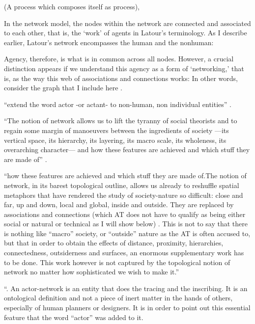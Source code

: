 (A process which composes itself as process), 



In the network model, the nodes within the network are connected and associated to each other, that is, the `work' of agents in Latour's terminology. As I describe earlier, Latour's network encompasses the human and the nonhuman: 

Agency, therefore, is what is in common across all nodes. However, a crucial distinction appears if we understand this agency as a form of `networking,' that is, as the way this web of associations and connections works: 
In other words, consider the graph that I include here . 

``extend the word actor -or actant- to non-human, non individual entities'' \parencite[2]{Lat90:On}.

``The notion of network allows us to lift the tyranny of social theorists and to regain some margin of manoeuvers between the ingredients of society ---its vertical space, its hierarchy, its layering, its macro scale, its wholeness, its overarching character--- and how these features are achieved and which stuff they are made of'' \parencite[5]{Lat90:On}.

``how these features are achieved and which stuff they are made of.The notion of network, in its barest topological outline, allows us already to reshuffle spatial metaphors that have rendered the study of society-nature so difficult: close and far, up and down, local and global, inside and outside. They are replaced by associations and connections (which AT does not have to qualify as being either social or natural or technical as I will show below) . This is not to say that there is nothing like “macro” society, or “outside” nature as the AT is often accused to, but that in order to obtain the effects of distance, proximity, hierarchies, connectedness, outsiderness and surfaces, an enormous supplementary work has to be done. This work however is not captured by the topological notion of network no matter how sophisticated we wish to make it.'' \parencite[6]{Lat90:On}

``. An actor-network is an entity that does the tracing and the inscribing. It is an ontological definition and not a piece of inert matter in the hands of others, especially of human planners or designers. It is in order to point out this essential feature that the word “actor” was added to it. \parencite[7]{Lat90:On}


